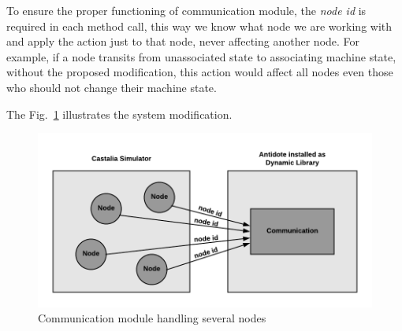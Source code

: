 To ensure the proper functioning of communication module, the \textit{node id} is required in each method call, this way we know what node we are working with and apply the action just to that node, never affecting another node. For example, if a node transits from unassociated state to associating machine state, without the proposed modification, this action would affect all nodes even those who should not change their machine state.

The Fig.~\ref{fig:communicationModuleCastalia} illustrates the system modification.

\begin{figure}[htbp]
\centerline{\includegraphics[scale=0.7]{figures/communicationModuleCastalia.png}}
\caption{Communication module handling several nodes}
\label{fig:communicationModuleCastalia}
\end{figure}